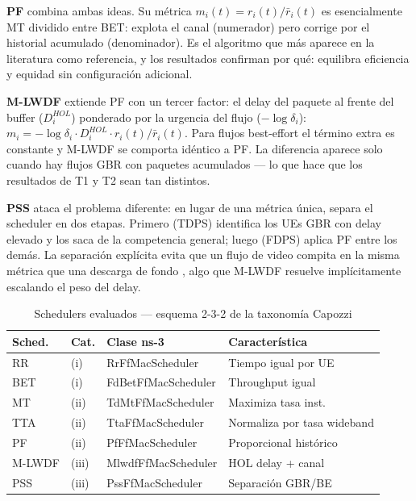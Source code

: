 \documentclass[conference]{IEEEtran}
\begin{document}
\textbf{PF} combina ambas ideas. Su métrica $m_i(t) = r_i(t)/\bar{r}_i(t)$ es
esencialmente MT dividido entre BET: explota el canal (numerador) pero corrige
por el historial acumulado (denominador). Es el algoritmo que más aparece en la
literatura como referencia, y los resultados confirman por qué: equilibra eficiencia
y equidad sin configuración adicional.

\textbf{M-LWDF} extiende PF con un tercer factor: el delay del paquete al frente
del buffer ($D_i^{HOL}$) ponderado por la urgencia del flujo ($-\log\delta_i$):
$m_i = {-\log\delta_i \cdot D_i^{HOL} \cdot r_i(t)}/{\bar{r}_i(t)}$. Para flujos
best-effort el término extra es constante y M-LWDF se comporta idéntico a PF.
La diferencia aparece solo cuando hay flujos GBR con paquetes acumulados
\cite{mlwdf2001} --- lo que hace que los resultados de T1 y T2 sean tan distintos.

\textbf{PSS} ataca el problema diferente: en lugar de una métrica única, separa
el scheduler en dos etapas. Primero (TDPS) identifica los UEs GBR con delay elevado
y los saca de la competencia general; luego (FDPS) aplica PF entre los demás.
La separación explícita evita que un flujo de video compita en la misma métrica
que una descarga de fondo \cite{pss2006}, algo que M-LWDF resuelve implícitamente
escalando el peso del delay.

\begin{table}[t]
  \centering
  \caption{Schedulers evaluados --- esquema 2-3-2 de la taxonomía Capozzi}
  \label{tab:schedulers}
  \footnotesize
  \begin{tabular}{@{}llp{2.8cm}p{2.8cm}@{}}
    \toprule
    \textbf{Sched.} & \textbf{Cat.} & \textbf{Clase ns-3} & \textbf{Característica} \\
    \midrule
    RR     & (i)   & RrFfMacScheduler    & Tiempo igual por UE \\
    BET    & (i)   & FdBetFfMacScheduler & Throughput igual \\
    MT     & (ii)  & TdMtFfMacScheduler  & Maximiza tasa inst. \\
    TTA    & (ii)  & TtaFfMacScheduler   & Normaliza por tasa wideband \\
    PF     & (ii)  & PfFfMacScheduler    & Proporcional histórico \\
    M-LWDF & (iii) & MlwdfFfMacScheduler & HOL delay + canal \\
    PSS    & (iii) & PssFfMacScheduler   & Separación GBR/BE \\
    \bottomrule
  \end{tabular}
\end{table}
\end{document}
